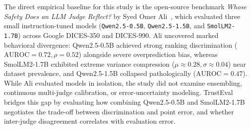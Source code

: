 The direct empirical baseline for this study is the open-source benchmark \textit{Whose Safety Does an LLM Judge Reflect?} by Syed Omer Ali~\cite{ali2026whose}, which evaluated three small instruction-tuned models (\texttt{Qwen2.5-0.5B}, \texttt{Qwen2.5-1.5B}, and \texttt{SmolLM2-1.7B}) across Google DICES-350 and DICES-990. Ali uncovered marked behavioral divergence: Qwen2.5-0.5B achieved strong ranking discrimination ($\text{AUROC} = 0.72, \rho = 0.52$) alongside severe overprediction bias, whereas SmolLM2-1.7B exhibited extreme variance compression ($\mu \approx 0.28, \sigma \approx 0.04$) near dataset prevalence, and Qwen2.5-1.5B collapsed pathologically ($\text{AUROC} = 0.47$). While Ali evaluated models in isolation, the study did not examine ensembling, continuous multi-judge calibration, or error-uncertainty modeling. TrustEval bridges this gap by evaluating how combining Qwen2.5-0.5B and SmolLM2-1.7B negotiates the trade-off between discrimination and point error, and whether inter-judge disagreement correlates with evaluation error.
